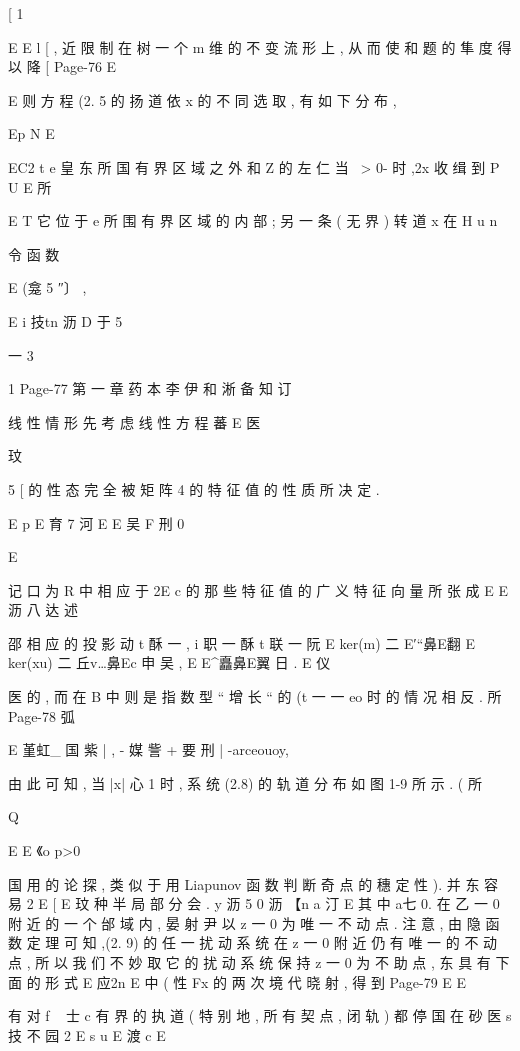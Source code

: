 {{[
1

E
E l
[
, 近 限 制 在 树 一 个 m 维 的 不 变 流 形 上 , 从 而 使 和 题 的 隼 度 得 以 降
[
Page-76
E

E
则 方 程 (2. 5 的 扬 道 依 x 的 不 同 选 取 , 有 如 下 分 布 ,

Ep N
E

EC2 t e 皇 东
所 国 有 界 区 域 之 外 和 Z 的 左 仁 当 ~> 0- 时 ,2x 收 缉 到 P U
E 所

E
T 它 位 于 e 所 围 有 界 区 域 的 内 部 ; 另 一 条 ( 无 界 ) 转 道 x 在 H
u n

令 函 数

E (龛 5 ″〕 ,

E i 技tn 沥
D
于
5

一 3

1
Page-77
第 一 章 药 本 李 伊 和 淅 备 知 订

线 性 情 形
先 考 虑 线 性 方 程
蕃 E 医

玟

5 [
的 性 态 完 全 被 矩 阵 4 的 特 征 值 的 性 质 所 决 定 .

E p
E 育 7 河
E
E 吴 F 刑
0

E

记 口 为 R 中 相 应 于 2E c 的 那 些 特 征 值 的 广 义 特 征 向 量 所 张 成
E
E 沥 八 达 述

邵 相 应 的 投 影
动 t 酥 一 , i 职 一 酥 t 联 一 阮
E
ker(m) 二 E′“鼻E翻 E
ker(xu) 二 丘v…鼻Ec 申 吴 ,
E E^矗鼻E翼 日 .
E 仪

医
的 , 而 在 B 中 则 是 指 数 型 “ 增 长 “ 的 (t 一 一 eo 时 的 情 况 相 反 . 所
Page-78
弧

E 堇虹_ 国
紫 | , - 媒 訾 + 要 刑 | -arceouoy,

由 此 可 知 , 当 |x| 心 1 时 , 系 统 (2.8) 的 轨 道 分 布 如 图 1-9 所 示 . ( 所

Q

E E 《o p>0

国
用 的 论 探 , 类 似 于 用 Liapunov 函 数 判 断 奇 点 的 穗 定 性 ). 并 东 容 易
2
E
[
E
玟
种 半 局 部 分 会 .
y 沥 5
0 沥
【n a 汀 E
其 中 a七 0. 在 乙 一 0 附 近 的 一 个 邰 域 内 , 晏 射 尹 以 z 一 0 为 唯 一
不 动 点 . 注 意 , 由 隐 函 数 定 理 可 知 ,(2. 9) 的 任 一 扰 动 系 统 在 z 一 0
附 近 仍 有 唯 一 的 不 动 点 , 所 以 我 们 不 妙 取 它 的 扰 动 系 统 保 持 z 一 0
为 不 助 点 , 东 具 有 下 面 的 形 式
E 应2n
E 中 (
性 Fx 的 两 次 境 代 晓 射 , 得 到
Page-79
E E

有 对 f ~ 士 c 有 界 的 执 道 ( 特 别 地 , 所 有 契 点 , 闭 轨 ) 都 停 国 在 砂
医 s 技 不 园 2
E s u
E 渡 c
E

}}
